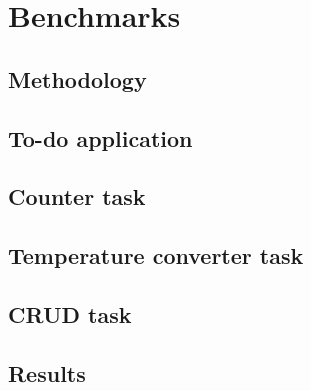 \chapter{Benchmarks}
\label{chap:walktrough}

\section{Methodology}
\section{To-do application}
\section{Counter task}
\section{Temperature converter task}
\section{CRUD task}
\section{Results}
